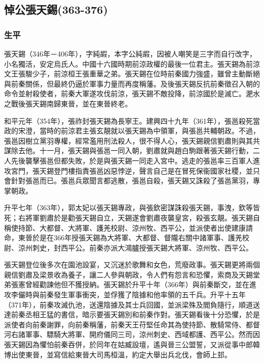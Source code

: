 
\subsection{悼公張天錫\tiny(363-376)}

\subsubsection{生平}

張天錫（346年－406年），字純嘏，本字公純嘏，因被人嘲笑是三字而自行改字，小名獨活，安定烏氏人。中國十六國時期前涼政權的最後一位君主。張天錫為前涼文王張駿少子，前涼桓王張重華之弟。張天錫在位時前秦國力強盛，雖曾主動斷絕與前秦關係，但最終仍逼於軍事力量而再度稱藩。及後張天錫反抗前秦徵召入朝的命令並射殺使者，前秦大軍遂攻伐前涼，張天錫不敵投降，前涼國於是滅亡。淝水之戰後張天錫南歸東晉，並在東晉終老。

和平元年（354年），張祚封張天錫為長寧王。建興四十九年（361年），張邕殺死當政的宋澄，當時的前涼君主張玄靚就以張天錫為中領軍，與張邕共輔朝政。不過，張邕因樹立黨羽專權，經常濫用刑法殺人，很不得人心，張天錫親信劉肅則與其共謀除去他。十一月，張天錫與張邕一同入朝，劉肅就與趙白駒跟著張天錫行動，二人先後襲擊張邕但都失敗，於是與張天錫一同走入宮中。逃走的張邕率三百軍人進攻宮門，張天錫登門樓指責張邕凶惡悖逆，聲言自己是在冒死保衞國家社稷，並只會針對張邕而已。張邕兵眾聞言都逃散，張邕自殺，張天錫又誅殺了張邕黨羽，專掌朝政。

升平七年（363年），郭太妃以張天錫專政，與張欽密謀誅殺張天錫，事洩，欽等皆死；右將軍劉肅於是勸張天錫自立，天錫遂會劉肅夜襲皇宮，殺張玄靚。張天錫自稱使持節、大都督、大將軍、護羌校尉、涼州牧、西平公，並派使者出使建康請命，東晉於是在366年授張天錫為大將軍、大都督、督隴右關中諸軍事、護羌校尉、涼州刺史，封西平公。前秦亦派大鴻臚授張天錫大將軍、涼州牧、西平公。

張天錫登位後多次在園池設宴，又沉迷於歌舞和女色，荒廢政事。張天錫更將兩個親信劉肅及梁景收為養子，讓二人參與朝政，令人們有怨言和恐懼，索商及天錫堂弟張憲曾經勸諫他但不獲授納。張天錫於升平十年（366年）與前秦斷交，並在進攻李儼時與前秦發生軍事衝突，並俘獲了陰據和他率領的五千兵。升平十五年（371年），前秦攻滅仇池，送還陰據及其士兵回國，並派梁殊及閻負隨行，順道送達前秦丞相王猛的書信，暗示要張天錫別和前秦作對。張天錫看後十分恐懼，於是派使者向前秦謝罪，向前秦稱藩，前秦天王苻堅任命其為使持節、散騎常侍、都督河右諸軍事、驃騎大將軍、開府儀同三司，涼州刺史、西域都護、西平公。然而因張天錫因為懼怕前秦吞併，於同年在姑臧設壇，遙與晉三公盟誓，又派從事中郎韓博出使東晉，並寫信給東晉大司馬桓溫，約定大舉出兵北伐，會師上邽。

